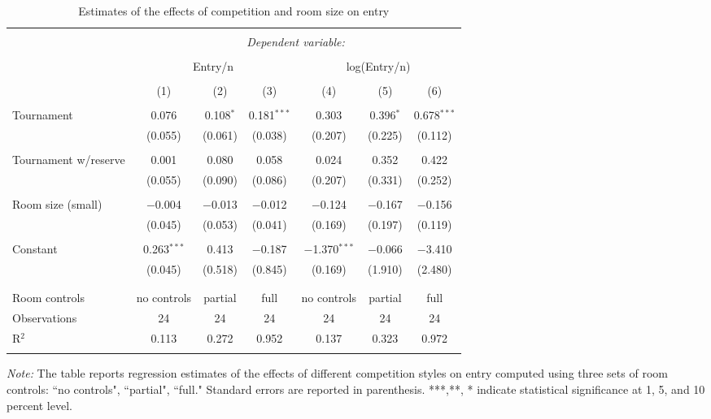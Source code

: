 \documentclass[11pt, titlepage]{article}
\begin{document}
\begin{table}
\centering
\caption{Estimates of the effects of competition and room size on entry}\label{ols entry}
\begin{tabular}{@{}lcccccc}
\\[-1.8ex]\hline 
\hline \\[-1.8ex] 
 & \multicolumn{6}{c}{\textit{Dependent variable:}} \\ 
\cline{2-7} 
\\[-1.8ex] & \multicolumn{3}{c}{Entry/n} & \multicolumn{3}{c}{log(Entry/n)} \\ 
\\[-1.8ex] & (1) & (2) & (3) & (4) & (5) & (6)\\ 
\hline \\[-1.8ex] 
 Tournament & 0.076 & 0.108$^{*}$ & 0.181$^{***}$ & 0.303 & 0.396$^{*}$ & 0.678$^{***}$ \\ 
  & (0.055) & (0.061) & (0.038) & (0.207) & (0.225) & (0.112) \\ 
  & & & & & & \\ 
 Tournament w/reserve & 0.001 & 0.080 & 0.058 & 0.024 & 0.352 & 0.422 \\ 
  & (0.055) & (0.090) & (0.086) & (0.207) & (0.331) & (0.252) \\ 
  & & & & & & \\ 
 Room size (small) & $-$0.004 & $-$0.013 & $-$0.012 & $-$0.124 & $-$0.167 & $-$0.156 \\ 
  & (0.045) & (0.053) & (0.041) & (0.169) & (0.197) & (0.119) \\ 
  & & & & & & \\ 
 Constant & 0.263$^{***}$ & 0.413 & $-$0.187 & $-$1.370$^{***}$ & $-$0.066 & $-$3.410 \\ 
  & (0.045) & (0.518) & (0.845) & (0.169) & (1.910) & (2.480) \\ 
  & & & & & & \\ 
\hline \\[-1.8ex] 
Room controls & no controls & partial & full & no controls & partial & full \\ 
Observations & 24 & 24 & 24 & 24 & 24 & 24 \\ 
R$^{2}$ & 0.113 & 0.272 & 0.952 & 0.137 & 0.323 & 0.972 \\ 
\hline 
\hline \\[-1.8ex] 
\end{tabular} 
\begin{minipage}{1.000000\textwidth}
\footnotesize\emph{Note:} The table reports regression estimates of the effects of different competition styles on entry computed using three sets of room controls: ``no controls", ``partial", ``full." Standard errors are reported in parenthesis. ***,**, * indicate statistical significance at 1, 5, and 10 percent level.
\end{minipage}
\end{table}
\end{document}
